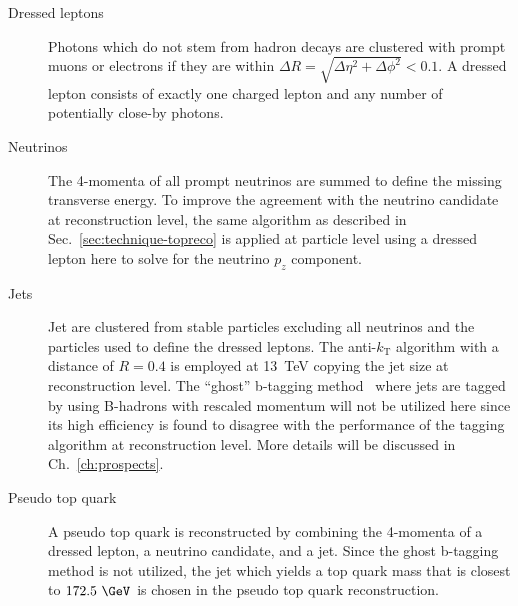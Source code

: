 
\begin{description}
\item[Dressed leptons] Photons which do not stem from hadron decays are clustered with prompt muons or electrons if they are within $\Delta R=\sqrt{\Delta\eta^2+\Delta\phi^2}<0.1$. A dressed lepton consists of exactly one charged lepton and any number of potentially close-by photons.
\item[Neutrinos] The 4-momenta of all prompt neutrinos are summed to define the missing transverse energy. To improve the agreement with the neutrino candidate at reconstruction level, the same algorithm as described in Sec.~\ref{sec:technique-topreco} is applied at particle level using a dressed lepton here to solve for the neutrino $p_{z}$ component.
\item[Jets] Jet are clustered from stable particles excluding all neutrinos and the particles used to define the dressed leptons. The anti-$k_\mathrm{T}$ algorithm with a distance of $R=0.4$ is employed at 13~TeV copying the jet size at reconstruction level. The ``ghost'' b-tagging method~\cite{Cacciari:2008gn} where jets are tagged by using B-hadrons with rescaled momentum will not be utilized here since its high efficiency is found to disagree with the performance of the tagging algorithm at reconstruction level. More details will be discussed in Ch.~\ref{ch:prospects}.
\item[Pseudo top quark] A pseudo top quark is reconstructed by combining the 4-momenta of a dressed lepton, a neutrino candidate, and a jet. Since the ghost b-tagging method is not utilized, the jet which yields a top quark mass that is closest to $172.5~\GeV$ is chosen in the pseudo top quark reconstruction.
\end{description}

